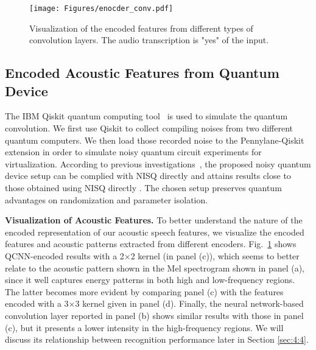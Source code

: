 \documentclass{article}
\begin{document}
\begin{figure}[ht!]
\begin{center}
\vspace{-2mm}
  \centering    
\texttt{[image: Figures/enocder\_conv.pdf]}
\end{center}
\vspace{-0.2cm}
  \caption{Visualization of the encoded features from different types of convolution layers. The audio transcription is "yes" of the input.
  } 
\label{fig:2:enc}
\end{figure}
\vspace{-0.4cm}

\subsection{Encoded Acoustic Features from Quantum Device}
The IBM Qiskit quantum computing tool~\cite{aleksandrowicz2019qiskit} is used to simulate the quantum convolution. 
We first use Qiskit to collect compiling noises from two different quantum computers. We then load those recorded noise to the Pennylane-Qiskit extension in order to simulate noisy quantum circuit experiments for virtualization. According to previous investigations~\cite{chen2020quantum, chen2020variational}, the proposed noisy quantum device setup can be complied with  NISQ directly and attains results close to those obtained using NISQ directly
. The chosen setup preserves quantum advantages on randomization and parameter isolation. 

\textbf{Visualization of Acoustic Features.} To better understand the nature of the encoded representation of our acoustic speech features, we visualize the encoded features and acoustic patterns extracted from different encoders. Fig.~\ref{fig:2:enc} shows QCNN-encoded results with a 2$\times$2 kernel (in panel (c)), which seems to better relate to the acoustic pattern shown in the Mel spectrogram shown in panel (a), since it well captures energy patterns in both high and low-frequency regions. The latter becomes more evident by comparing panel (c) with the features encoded with a 3$\times$3 kernel given in panel (d). Finally, the neural network-based convolution layer reported in panel (b) shows similar results with those in panel (c), but it presents a lower intensity in the high-frequency  regions. We will discuss its relationship between recognition performance later in Section \ref{sec:4:4}.
\end{document}
